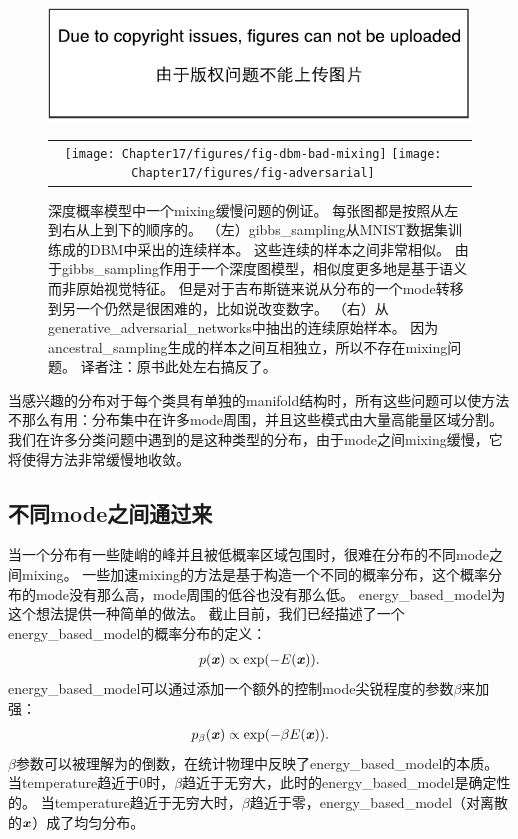 \begin{figure}[!htb]
\ifOpenSource
\centerline{\includegraphics{figure.pdf}}
\else
    \centering
    \begin{tabular}{cc}
    \texttt{[image: Chapter17/figures/fig-dbm-bad-mixing]}
    \texttt{[image: Chapter17/figures/fig-adversarial]}    
    \end{tabular}
\fi
\caption{深度概率模型中一个\gls{mixing}缓慢问题的例证。
每张图都是按照从左到右从上到下的顺序的。
（左）\gls{gibbs_sampling}从MNIST数据集训练成的\gls{DBM}中采出的连续样本。
这些连续的样本之间非常相似。
由于\gls{gibbs_sampling}作用于一个深度图模型，相似度更多地是基于语义而非原始视觉特征。
但是对于吉布斯链来说从分布的一个\gls{mode}转移到另一个仍然是很困难的，比如说改变数字。
（右）从\gls{generative_adversarial_networks}中抽出的连续原始样本。
因为\gls{ancestral_sampling}生成的样本之间互相独立，所以不存在\gls{mixing}问题。
{译者注：原书此处左右搞反了。}} %
\label{fig:chap17_fig-dbm-bad-mixing}
\end{figure}


当感兴趣的分布对于每个类具有单独的\gls{manifold}结构时，所有这些问题可以使方法不那么有用：分布集中在许多\gls{mode}周围，并且这些模式由大量高能量区域分割。
我们在许多分类问题中遇到的是这种类型的分布，由于\gls{mode}之间\gls{mixing}缓慢，它将使得方法非常缓慢地收敛。



\subsection{不同\gls{mode}之间通过来}
\label{sec:tempering_to_mix_between_modes}

当一个分布有一些陡峭的峰并且被低概率区域包围时，很难在分布的不同\gls{mode}之间\gls{mixing}。
一些加速\gls{mixing}的方法是基于构造一个不同的概率分布，这个概率分布的\gls{mode}没有那么高，\gls{mode}周围的低谷也没有那么低。
\gls{energy_based_model}为这个想法提供一种简单的做法。
截止目前，我们已经描述了一个\gls{energy_based_model}的概率分布的定义：
\begin{align}
\label{eqn:1725}
p(\boldsymbol{\mathit{x}}) \propto \exp(-E(\boldsymbol{\mathit{x}})).
\end{align}
\gls{energy_based_model}可以通过添加一个额外的控制\gls{mode}尖锐程度的参数$\beta$来加强：
\begin{align}
\label{eqn:1726}
p_{\beta}(\boldsymbol{\mathit{x}}) \propto \exp(-\beta E(\boldsymbol{\mathit{x}})).
\end{align}
$\beta$参数可以被理解为的倒数，在统计物理中反映了\gls{energy_based_model}的本质。
当\gls{temperature}趋近于0时，$\beta$趋近于无穷大，此时的\gls{energy_based_model}是确定性的。
当\gls{temperature}趋近于无穷大时，$\beta$趋近于零，\gls{energy_based_model}（对离散的$\boldsymbol{\mathit{x}}$）成了均匀分布。

